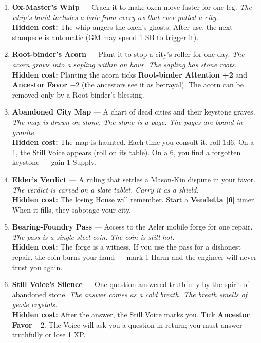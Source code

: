 \begin{enumerate}
\item \textbf{Ox-Master's Whip} --- Crack it to make oxen move faster for one leg.
  \hfill \textit{The whip's braid includes a hair from every ox that ever pulled a city.} \\
  \textbf{Hidden cost:} The whip angers the oxen's ghosts. After use, the next stampede is automatic (GM may spend 1 SB to trigger it).

\item \textbf{Root-binder's Acorn} --- Plant it to stop a city's roller for one day.
  \hfill \textit{The acorn grows into a sapling within an hour. The sapling has stone roots.} \\
  \textbf{Hidden cost:} Planting the acorn ticks \textbf{Root-binder Attention +2} and \textbf{Ancestor Favor $-2$} (the ancestors see it as betrayal). The acorn can be removed only by a Root-binder's blessing.

\item \textbf{Abandoned City Map} --- A chart of dead cities and their keystone graves.
  \hfill \textit{The map is drawn on stone. The stone is a page. The pages are bound in granite.} \\
  \textbf{Hidden cost:} The map is haunted. Each time you consult it, roll $1\text{d}6$. On a 1, the Still Voice appears (roll on its table). On a 6, you find a forgotten keystone --- gain 1 Supply.

\item \textbf{Elder's Verdict} --- A ruling that settles a Mason-Kin dispute in your favor.
  \hfill \textit{The verdict is carved on a slate tablet. Carry it as a shield.} \\
  \textbf{Hidden cost:} The losing House will remember. Start a \textbf{Vendetta [6]} timer. When it fills, they sabotage your city.

\item[J] \textbf{Bearing-Foundry Pass} --- Access to the Aeler mobile forge for one repair.
  \hfill \textit{The pass is a single steel coin. The coin is still hot.} \\
  \textbf{Hidden cost:} The forge is a witness. If you use the pass for a dishonest repair, the coin burns your hand --- mark 1 Harm and the engineer will never trust you again.

\item[Q] \textbf{Still Voice's Silence} --- One question answered truthfully by the spirit of abandoned stone.
  \hfill \textit{The answer comes as a cold breath. The breath smells of geode crystals.} \\
  \textbf{Hidden cost:} After the answer, the Still Voice marks you. Tick \textbf{Ancestor Favor $-2$}. The Voice will ask you a question in return; you must answer truthfully or lose 1 XP.


\end{enumerate}
